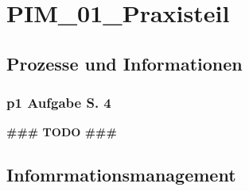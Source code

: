 
\section{PIM\_01\_Praxisteil}


\subsection{Prozesse und Informationen}

\subsubsection{p1 Aufgabe S. 4}
\textbf{\#\#\# TODO \#\#\#}\\

\subsection{Infomrmationsmanagement}



